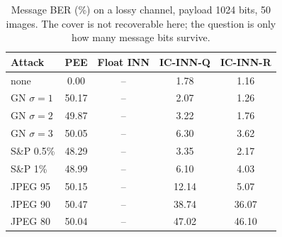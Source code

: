 \begin{table}[t]
\centering
\caption{Message BER (\%) on a lossy channel, payload 1024 bits, 50 images. The cover is not recoverable here; the question is only how many message bits survive.}
\label{tab:robust}
\setlength{\tabcolsep}{4pt}
\begin{tabular}{lcccc}
\toprule
Attack & PEE & Float INN & IC-INN-Q & IC-INN-R\\
\midrule
none & 0.00 & -- & 1.78 & 1.16\\
GN $\sigma{=}1$ & 50.17 & -- & 2.07 & 1.26\\
GN $\sigma{=}2$ & 49.87 & -- & 3.22 & 1.76\\
GN $\sigma{=}3$ & 50.05 & -- & 6.30 & 3.62\\
S\&P 0.5\% & 48.29 & -- & 3.35 & 2.17\\
S\&P 1\% & 48.99 & -- & 6.10 & 4.03\\
JPEG 95 & 50.15 & -- & 12.14 & 5.07\\
JPEG 90 & 50.47 & -- & 38.74 & 36.07\\
JPEG 80 & 50.04 & -- & 47.02 & 46.10\\
\bottomrule
\end{tabular}
\end{table}
